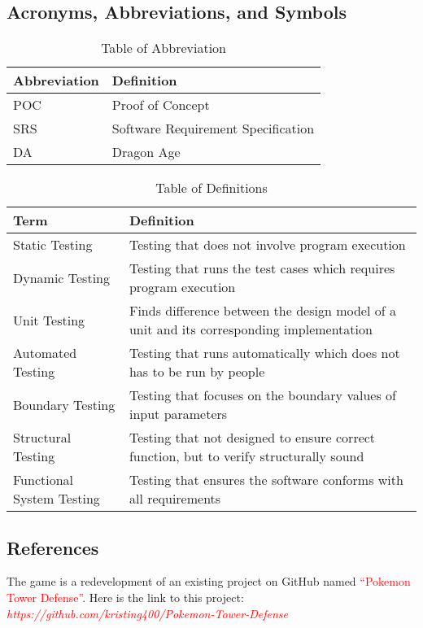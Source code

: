\documentclass[12,english]{article}
\begin{document}
\newpage
\subsection{Acronyms, Abbreviations, and Symbols}
\newline
\begin{table}[h!]
    \centering
    \begin{tabular}{|p{3cm}|p{6cm}|}
    \hline
    \textbf {Abbreviation} & {Definition}\\
    \hline
    POC & Proof of Concept\\
    \hline
    SRS & Software Requirement Specification\\
    \hline
    DA & Dragon Age\\
    \hline
    \end{tabular}
    \caption{Table of Abbreviation}
\end{table}

\begin{table}[h!]
    \centering
    \begin{tabular}{|p{3cm}|p{8cm}|}
    \hline
    \textbf {Term} & {Definition}\\
    \hline
    Static Testing & Testing that does not involve program execution\\
    \hline
    Dynamic Testing & Testing that runs the test cases which requires program execution\\
    \hline
    Unit Testing & Finds difference between the design model of a unit and its corresponding implementation\\
    \hline
    Automated Testing & Testing that runs automatically which does not has to be run by people\\
    \hline
    Boundary Testing & Testing that focuses on the boundary values of input parameters\\
    \hline
    Structural Testing & Testing that not designed to ensure correct function, but to verify structurally sound\\
    \hline
    Functional System Testing & Testing that ensures the software conforms with all requirements\\
    \hline
    \end{tabular}
    \caption{Table of Definitions}
\end{table}

\subsection{References}
The game is a redevelopment of an existing project on GitHub named \textcolor{red}{``Pokemon Tower Defense''}. Here is the link to this project: 
\textcolor{red}{\textit{https://github.com/kristing400/Pokemon-Tower-Defense}}
\end{document}
